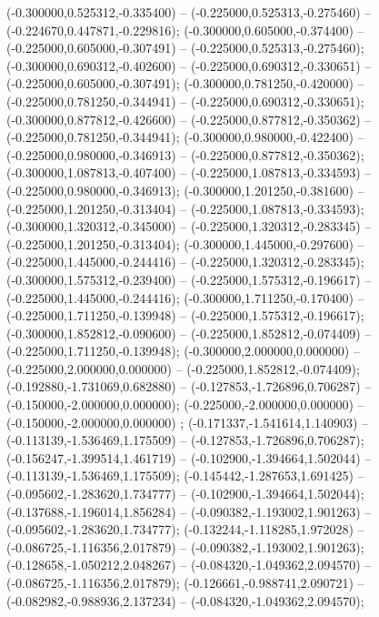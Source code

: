  (-0.300000,0.525312,-0.335400) -- (-0.225000,0.525313,-0.275460) -- (-0.224670,0.447871,-0.229816);
 (-0.300000,0.605000,-0.374400) -- (-0.225000,0.605000,-0.307491) -- (-0.225000,0.525313,-0.275460);
 (-0.300000,0.690312,-0.402600) -- (-0.225000,0.690312,-0.330651) -- (-0.225000,0.605000,-0.307491);
 (-0.300000,0.781250,-0.420000) -- (-0.225000,0.781250,-0.344941) -- (-0.225000,0.690312,-0.330651);
 (-0.300000,0.877812,-0.426600) -- (-0.225000,0.877812,-0.350362) -- (-0.225000,0.781250,-0.344941);
 (-0.300000,0.980000,-0.422400) -- (-0.225000,0.980000,-0.346913) -- (-0.225000,0.877812,-0.350362);
 (-0.300000,1.087813,-0.407400) -- (-0.225000,1.087813,-0.334593) -- (-0.225000,0.980000,-0.346913);
 (-0.300000,1.201250,-0.381600) -- (-0.225000,1.201250,-0.313404) -- (-0.225000,1.087813,-0.334593);
 (-0.300000,1.320312,-0.345000) -- (-0.225000,1.320312,-0.283345) -- (-0.225000,1.201250,-0.313404);
 (-0.300000,1.445000,-0.297600) -- (-0.225000,1.445000,-0.244416) -- (-0.225000,1.320312,-0.283345);
 (-0.300000,1.575312,-0.239400) -- (-0.225000,1.575312,-0.196617) -- (-0.225000,1.445000,-0.244416);
 (-0.300000,1.711250,-0.170400) -- (-0.225000,1.711250,-0.139948) -- (-0.225000,1.575312,-0.196617);
 (-0.300000,1.852812,-0.090600) -- (-0.225000,1.852812,-0.074409) -- (-0.225000,1.711250,-0.139948);
 (-0.300000,2.000000,0.000000) -- (-0.225000,2.000000,0.000000) -- (-0.225000,1.852812,-0.074409);
 (-0.192880,-1.731069,0.682880) -- (-0.127853,-1.726896,0.706287) -- (-0.150000,-2.000000,0.000000);
 (-0.225000,-2.000000,0.000000) -- (-0.150000,-2.000000,0.000000) ;
 (-0.171337,-1.541614,1.140903) -- (-0.113139,-1.536469,1.175509) -- (-0.127853,-1.726896,0.706287);
 (-0.156247,-1.399514,1.461719) -- (-0.102900,-1.394664,1.502044) -- (-0.113139,-1.536469,1.175509);
 (-0.145442,-1.287653,1.691425) -- (-0.095602,-1.283620,1.734777) -- (-0.102900,-1.394664,1.502044);
 (-0.137688,-1.196014,1.856284) -- (-0.090382,-1.193002,1.901263) -- (-0.095602,-1.283620,1.734777);
 (-0.132244,-1.118285,1.972028) -- (-0.086725,-1.116356,2.017879) -- (-0.090382,-1.193002,1.901263);
 (-0.128658,-1.050212,2.048267) -- (-0.084320,-1.049362,2.094570) -- (-0.086725,-1.116356,2.017879);
 (-0.126661,-0.988741,2.090721) -- (-0.082982,-0.988936,2.137234) -- (-0.084320,-1.049362,2.094570);
